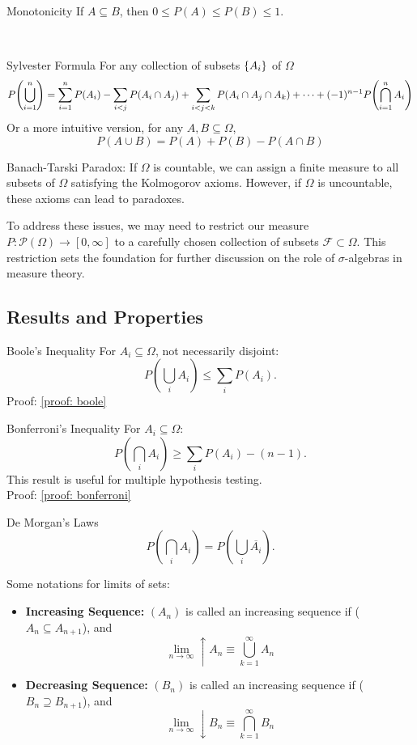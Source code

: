 \begin{cor}{Monotonicity}
If $A\subseteq B$, then $0\leq P(A) \leq P(B)\leq 1$. 	
\end{cor}\


\begin{cor}{Sylvester Formula}
For any collection of subsets $\qty{A_i}$ of $\Omega$
$$P\qty(\bigcup_{i=1}^n) = \sum_{i=1}^nP(A_i) - \sum_{i<j}P(A_i\cap A_j) + \sum_{i<j<k}P(A_i\cap A_j\cap A_k) + \dots + (-1)^{n-1}P\qty(\bigcap_{i=1}^nA_i)$$
Or a more intuitive version, for any $A, B\subseteq \Omega$, 
$$P(A\cup B) = P(A)+P(B)-P(A\cap B)$$
\end{cor}

\begin{rmk}{Banach-Tarski Paradox:}
If \(\Omega\) is countable, we can assign a finite measure to all subsets of \(\Omega\) satisfying the Kolmogorov axioms. However, if \(\Omega\) is uncountable, these axioms can lead to paradoxes.
\end{rmk}

\noindent To address these issues, we may need to restrict our measure $P: \mathscr{P}(\Omega)\rightarrow [0, \infty]$ to a carefully chosen collection of subsets $\mathcal{F}\subset \Omega$. This restriction sets the foundation for further discussion on the role of $\sigma$-algebras in measure theory.

\subsection{Results and Properties}

\begin{prop}{Boole's Inequality}
For \(A_i \subseteq \Omega\), not necessarily disjoint:
\[
P\left(\bigcup_i A_i\right) \leq \sum_i P(A_i).
\]
Proof: \ref{proof: boole}
\end{prop}

\begin{prop}{Bonferroni's Inequality}
For \(A_i \subseteq \Omega\):
\[
P\left(\bigcap_i A_i\right) \geq \sum_i P(A_i) - (n-1).
\]
This result is useful for multiple hypothesis testing.\\
Proof: \ref{proof: bonferroni}
\end{prop}

\begin{prop}{De Morgan's Laws}
\[
P\left(\bigcap_i A_i\right) = P\left(\bigcup_i \overline{A_i}\right).
\]
\end{prop}

\noindent Some notations for limits of sets:  
\begin{itemize}
	\item \textbf{Increasing Sequence: }\((A_n)\) is called an increasing sequence if (\(A_n \subseteq A_{n+1}\)), and 
	$$\lim_{n\to \infty} \uparrow A_n \equiv \bigcup_{k=1}^\infty A_n$$
	\item \textbf{Decreasing Sequence: }\((B_n)\) is called an increasing sequence if (\(B_n \supseteq B_{n+1}\)), and 
	$$\lim_{n\to \infty} \downarrow B_n \equiv \bigcap_{k=1}^\infty B_n$$
\end{itemize}

